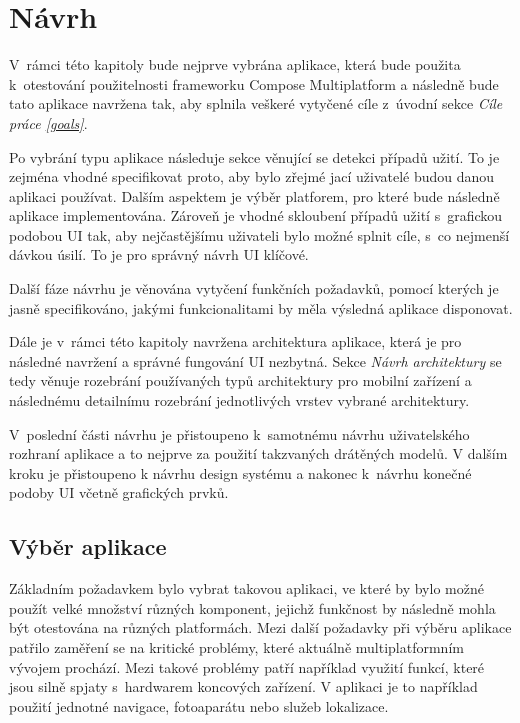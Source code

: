 \chapter{Návrh}
V~rámci této kapitoly bude nejprve vybrána aplikace, která bude použita k~otestování použitelnosti frameworku Compose Multiplatform a následně
bude tato aplikace navržena tak, aby splnila veškeré vytyčené cíle z~úvodní sekce \textit{Cíle práce \ref{goals}}.

Po vybrání typu aplikace následuje sekce věnující se detekci případů užití. To je zejména vhodné specifikovat proto, aby bylo zřejmé jací 
uživatelé budou danou aplikaci používat. Dalším aspektem je výběr platforem, pro které bude následně aplikace implementována. %
Zároveň je vhodné skloubení případů užití s~grafickou podobou UI tak, aby nejčastějšímu uživateli bylo možné splnit cíle, s~co nejmenší dávkou úsilí. 
To je pro správný návrh UI klíčové. 


Další fáze návrhu je věnována vytyčení funkčních požadavků, pomocí kterých je jasně specifikováno, jakými funkcionalitami by měla výsledná 
aplikace disponovat. 

Dále je v~rámci této kapitoly navržena architektura aplikace, která je pro následné navržení a správné fungování UI nezbytná. Sekce \textit{Návrh architektury} se tedy věnuje rozebrání používaných typů architektury pro mobilní zařízení a následnému detailnímu
rozebrání jednotlivých vrstev vybrané architektury.

V~poslední části návrhu je přistoupeno k~samotnému návrhu uživatelského rozhraní aplikace a to nejprve za použití takzvaných drátěných modelů. V dalším kroku je přistoupeno k návrhu design systému a nakonec k~návrhu konečné podoby UI včetně grafických prvků.


\section{Výběr aplikace}
Základním požadavkem bylo vybrat takovou aplikaci, ve které by bylo možné použít velké množství různých komponent, jejichž funkčnost by následně mohla být otestována
na různých platformách.
Mezi další požadavky při výběru aplikace patřilo zaměření se na kritické problémy, které aktuálně multiplatformním vývojem prochází. 
Mezi takové problémy patří například využití funkcí, které jsou silně spjaty s~hardwarem koncových zařízení. V aplikaci je to například použití jednotné navigace, fotoaparátu 
nebo služeb lokalizace.

